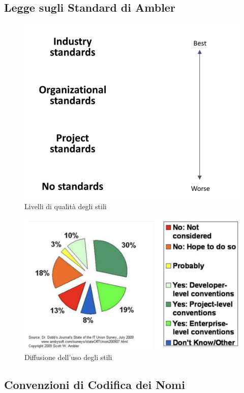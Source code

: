 \documentclass{article}
\begin{document}
	\subsection{Legge sugli Standard di Ambler}
	\begin{figure}[h]
		\centering
		\includegraphics[scale=0.3]{2.qual_stili.png}
		\caption{Livelli di qualità degli stili}
	\end{figure}
	\begin{figure}[h]
		\centering
		\includegraphics[scale=0.3]{3.diff_stili.png}
		\caption{Diffusione dell'uso degli stili}
	\end{figure}
	\subsection{Convenzioni di Codifica dei Nomi}
\end{document}
